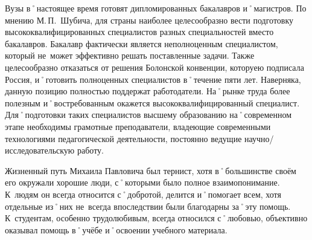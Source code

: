 Вузы в˚настоящее время готовят дипломированных бакалавров и˚магистров. По мнению М.\,П.~Шубича, для страны наиболее целесообразно вести подготовку высококвалифицированных специалистов разных специальностей вместо бакалавров. Бакалавр фактически является неполноценным специалистом, который не~может эффективно решать поставленные задачи. Также целесообразно отказаться от решения Болонской конвенции, которуею подписала Россия, и˚готовить полноценных специалистов в˚течение пяти лет. Наверняка, данную позицию полностью поддержат работодатели. На˚рынке труда более полезным и˚востребованным окажется высококвалифицированный специалист. Для˚подготовки таких специалистов высшему образованию на˚современном этапе необходимы грамотные преподаватели, владеющие современными технологиями педагогической деятельности, постоянно ведущие научно\-/исследовательскую работу.

Жизненный путь Михаила Павловича был тернист, хотя в˚большинстве своём его окружали  хорошие люди, с˚которыми было полное взаимопонимание. К~людям он всегда относится с˚добротой, делится и˚помогает всем, хотя отдельные из˚них не~всегда впоследствии были благодарны за˚эту помощь. К~студентам, особенно трудолюбивым, всегда относился с˚любовью, объективно оказывал помощь в˚учёбе и˚освоении учебного материала.
